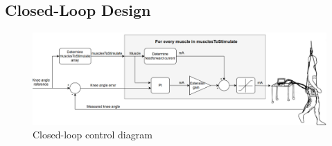 \subsection{Closed-Loop Design}
\begin{figure} [H]
    \centering
    \includegraphics[width=1.1\linewidth]{images/controldiam3.png}
    \caption{Closed-loop control diagram}
    \label{fig:cldiam}
\end{figure}
\newpage
